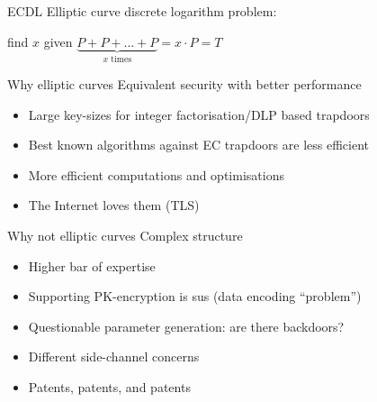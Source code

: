 \begin{frame}{ECDL}
  Elliptic curve discrete logarithm problem:
  \begin{center}
    find $x$ given $\underbrace{P + P + \dots + P}_{x \text{ times}} = x\cdot P = T$
  \end{center}
\end{frame}

\iffalse
\begin{frame}{Elliptic curve cryptography}
  \begin{tikzpicture}
    \begin{axis}[
            xmin=-4,
            xmax=5,
            ymin=-5,
            ymax=5,
            xlabel={$x$},
            ylabel={$y$},
            scale only axis,
            axis lines=middle,
            domain=-2.279018:3,      
            samples=201,
            smooth,   
            clip=false,
            axis equal image=true,
        ]
    
    \addplot[blue] {sqrt(x^3-3*x+5)} node[right] {$E$};
    \addplot[blue] {-sqrt(x^3-3*x+5)};
    \addplot[red] {2.621+0.251*(x+1.2)};
    
    
        \draw [fill=black] (axis cs:-1.2,2.6) circle (2pt);
        \draw[color=black] (axis cs:-1.4,2.7) node [left]{$P$};
    \end{axis}
    \end{tikzpicture}
\end{frame}
\fi

\begin{frame}{Why elliptic curves}
  Equivalent security with better performance
  \begin{itemize}[<+(1)->]
    \item Large key-sizes for integer factorisation/DLP based trapdoors
    \item Best known algorithms against EC trapdoors are less efficient
    \item More efficient computations and optimisations
    \item The Internet loves them (TLS)
  \end{itemize}
\end{frame}

\begin{frame}{Why not elliptic curves}
  Complex structure
  \begin{itemize}[<+(1)->]
    \item Higher bar of expertise
    \item Supporting PK-encryption is sus (data encoding \enquote{problem})
    \item Questionable parameter generation: are there backdoors?
    \item Different side-channel concerns
    \item Patents, patents, and patents
  \end{itemize}
\end{frame}

